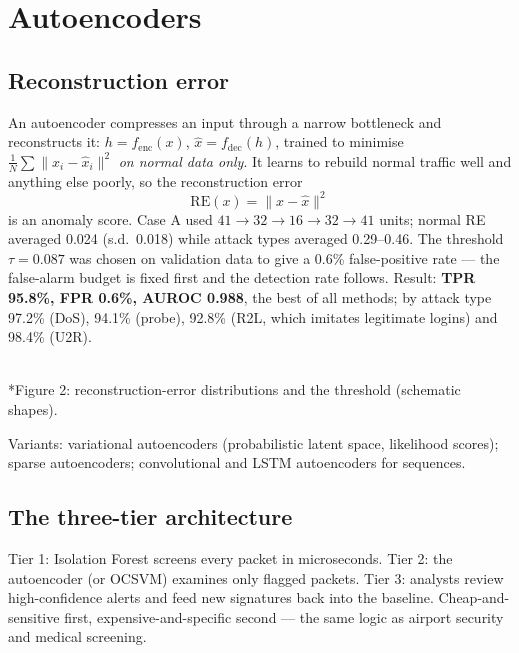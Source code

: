 \documentclass[11pt]{article}
\begin{document}
\section{Autoencoders}
\subsection{Reconstruction error}
An autoencoder compresses an input through a narrow bottleneck and reconstructs it: $h=f_{\text{enc}}(x)$, $\hat x=f_{\text{dec}}(h)$, trained to minimise $\frac1N\sum\|x_i-\hat x_i\|^2$ \emph{on normal data only}. It learns to rebuild normal traffic well and anything else poorly, so the reconstruction error
\[\text{RE}(x)=\|x-\hat x\|^2\]
is an anomaly score. Case A used $41\to32\to16\to32\to41$ units; normal RE averaged 0.024 (s.d.\ 0.018) while attack types averaged 0.29--0.46. The threshold $\tau=0.087$ was chosen on validation data to give a 0.6\% false-positive rate --- the false-alarm budget is fixed first and the detection rate follows. Result: \textbf{TPR 95.8\%, FPR 0.6\%, AUROC 0.988}, the best of all methods; by attack type 97.2\% (DoS), 94.1\% (probe), 92.8\% (R2L, which imitates legitimate logins) and 98.4\% (U2R).
\begin{center}\\*{\small\color{GreyN}Figure 2: reconstruction-error distributions and the threshold (schematic shapes).}\end{center}
Variants: variational autoencoders (probabilistic latent space, likelihood scores); sparse autoencoders; convolutional and LSTM autoencoders for sequences.

\subsection{The three-tier architecture}
Tier 1: Isolation Forest screens every packet in microseconds. Tier 2: the autoencoder (or OCSVM) examines only flagged packets. Tier 3: analysts review high-confidence alerts and feed new signatures back into the baseline. Cheap-and-sensitive first, expensive-and-specific second --- the same logic as airport security and medical screening.
\end{document}
